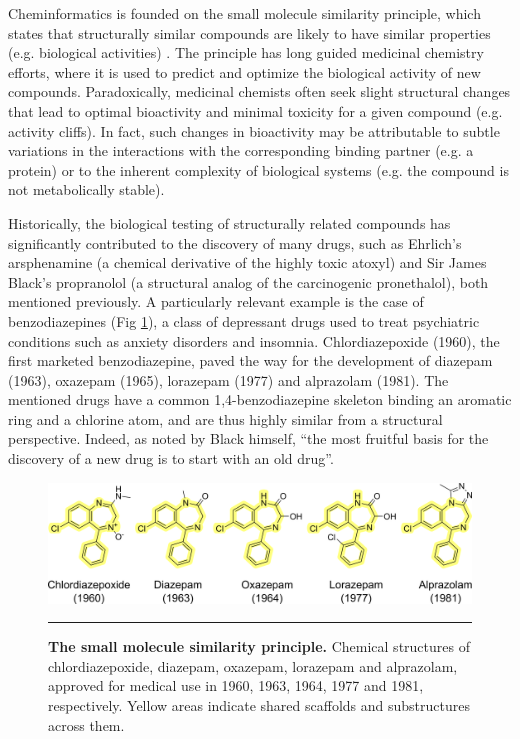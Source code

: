 Cheminformatics is founded on the small molecule similarity principle, which states that structurally similar compounds are likely to have similar properties (e.g. biological activities) \cite{johnson_concepts_1990}. The principle has long guided medicinal chemistry efforts, where it is used to predict and optimize the biological activity of new compounds. Paradoxically, medicinal chemists often seek slight structural changes that lead to optimal bioactivity and minimal toxicity for a given compound (e.g. activity cliffs). In fact, such changes in bioactivity may be attributable to subtle variations in the interactions with the corresponding binding partner (e.g. a protein) or to the inherent complexity of biological systems (e.g. the compound is not metabolically stable). 

Historically, the biological testing of structurally related compounds has significantly contributed to the discovery of many drugs, such as Ehrlich’s arsphenamine (a chemical derivative of the highly toxic atoxyl) and Sir James Black’s propranolol (a structural analog of the carcinogenic pronethalol), both mentioned previously. A particularly relevant example is the case of benzodiazepines (Fig \ref{Introduction_Fig1}), a class of depressant drugs used to treat psychiatric conditions such as anxiety disorders and insomnia. Chlordiazepoxide (1960), the first marketed benzodiazepine, paved the way for the development of diazepam (1963), oxazepam (1965), lorazepam (1977) and alprazolam (1981). The mentioned drugs have a common 1,4-benzodiazepine skeleton binding an aromatic ring and a chlorine atom, and are thus highly similar from a structural perspective\cite{wick_history_2013, costa_clinical_1984}. Indeed, as noted by Black himself, “the most fruitful basis for the discovery of a new drug is to start with an old drug”\cite{pillaiyar_medicinal_2020, raju_nobel_2000}.

\begin{figure}[t!]
  \centering
  \includegraphics[width=\linewidth]{figures/Introduction/Benzodiazepines.png}
  \caption{
    \textbf{The small molecule similarity principle.} 
    Chemical structures of chlordiazepoxide, diazepam, oxazepam, lorazepam and alprazolam, approved for medical use in 1960, 1963, 1964, 1977 and 1981, respectively. Yellow areas indicate shared scaffolds and substructures across them.
  }
  \rule[0ex]{\textwidth}{0.5pt}
  \label{Introduction_Fig1}
\end{figure}

